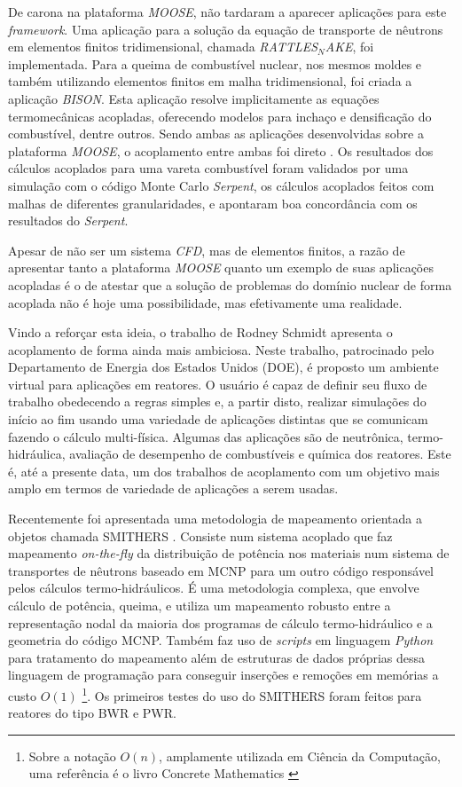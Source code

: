 De carona na plataforma \textit{MOOSE}, não tardaram a aparecer aplicações para
este \textit{framework}. Uma aplicação para a solução da equação de transporte
de nêutrons em elementos finitos tridimensional, chamada \textit{RATTLES$_{N}$AKE},
foi implementada. Para a queima de combustível nuclear, nos mesmos moldes e
também utilizando elementos finitos em malha tridimensional, foi criada a aplicação
\textit{BISON}. Esta aplicação resolve implicitamente as equações termomecânicas
acopladas, oferecendo modelos para inchaço e densificação do combustível, dentre outros.
Sendo ambas as aplicações desenvolvidas sobre a plataforma \textit{MOOSE}, o acoplamento
entre ambas foi direto \cite{Gleicher2014}.
Os resultados dos cálculos acoplados para uma vareta combustível foram validados por uma simulação com o código Monte Carlo \textit{Serpent},
os cálculos acoplados feitos com malhas de diferentes granularidades, e apontaram boa
concordância com os resultados do \textit{Serpent}.

Apesar de não ser um sistema \textit{CFD}, mas de elementos finitos, a razão de
apresentar tanto a plataforma \textit{MOOSE} quanto um exemplo de suas aplicações
acopladas é o de atestar que a solução de problemas do domínio nuclear de forma
acoplada não é hoje uma possibilidade, mas efetivamente uma realidade.

Vindo a reforçar esta ideia, o trabalho de Rodney Schmidt \cite{Schmidt2015} apresenta o acoplamento
de forma ainda mais ambiciosa. Neste trabalho, patrocinado pelo Departamento de Energia dos Estados
Unidos (DOE), é proposto um ambiente virtual para aplicações em reatores. O usuário é capaz de definir
seu fluxo de trabalho obedecendo a regras simples e, a partir disto, realizar simulações do início ao
fim usando uma variedade de aplicações distintas que se comunicam fazendo o cálculo multi-física. Algumas
das aplicações são de neutrônica, termo-hidráulica, avaliação de desempenho de combustíveis e química
dos reatores. Este é, até a presente data, um dos trabalhos de acoplamento com um objetivo mais amplo
em termos de variedade de aplicações a serem usadas.

Recentemente foi apresentada uma metodologia de mapeamento orientada a objetos chamada
SMITHERS \cite{Richard2015}. Consiste num sistema acoplado que faz mapeamento \textit{on-the-fly}
da distribuição de potência nos materiais num sistema de transportes de nêutrons baseado
em MCNP para um outro código responsável pelos cálculos termo-hidráulicos. É uma metodologia
complexa, que envolve cálculo de potência, queima, e utiliza um mapeamento robusto entre
a representação nodal da maioria dos programas de cálculo termo-hidráulico e a geometria
do código MCNP. Também faz uso de \textit{scripts} em linguagem \textit{Python} para
tratamento do mapeamento além de estruturas de dados próprias dessa linguagem de programação
para conseguir inserções e remoções em memórias a custo $O(1)$
\footnote{Sobre a notação $O(n)$, amplamente utilizada em Ciência da Computação, uma
  referência é o livro Concrete Mathematics \cite[Seção~9.2]{Graham1994}}.
Os primeiros testes do uso do SMITHERS foram feitos para reatores do tipo BWR e
PWR.

